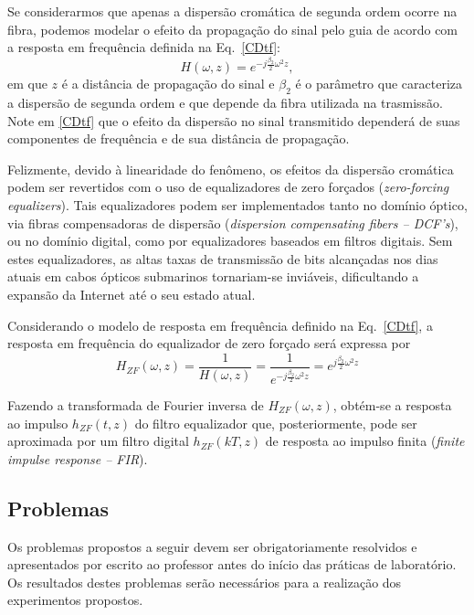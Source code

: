 \documentclass[12pt,addpoints]{exam}
\begin{document}
Se considerarmos que apenas a dispersão cromática de segunda ordem ocorre na fibra, podemos modelar o efeito da propagação do sinal pelo guia de acordo com a resposta em frequência definida na Eq.~\ref{CDtf}:
\begin{equation}\label{CDtf}
    H(\omega, z) = e^{-j\frac{\beta_2}{2}\omega^2z},
\end{equation}
\noindent em que $z$ é a distância de propagação do sinal e $\beta_2$ é o parâmetro que caracteriza a dispersão de segunda ordem e que depende da fibra utilizada na trasmissão. Note em \ref{CDtf} que o efeito da dispersão no sinal transmitido dependerá de suas componentes de frequência e de sua distância de propagação.

Felizmente, devido à linearidade do fenômeno, os efeitos da dispersão cromática podem ser revertidos com o uso de equalizadores de zero forçados (\textit{zero-forcing equalizers}). Tais equalizadores podem ser implementados tanto no domínio óptico, via fibras compensadoras de dispersão (\textit{dispersion compensating fibers -- DCF's}), ou no domínio digital, como por equalizadores baseados em filtros digitais. Sem estes equalizadores, as altas taxas de transmissão de bits alcançadas nos dias atuais em cabos ópticos submarinos tornariam-se inviáveis, dificultando a expansão da Internet até o seu estado atual.

Considerando o modelo de resposta em frequência definido na Eq.~\ref{CDtf}, a resposta em frequência do equalizador de zero forçado será expressa por
\begin{equation}\label{CDzf}
H_{ZF}(\omega, z) = \frac{1}{H(\omega, z)}= \frac{1}{e^{-j\frac{\beta_2}{2}\omega^2z}} = e^{j\frac{\beta_2}{2}\omega^2z}
\end{equation}

Fazendo a transformada de Fourier inversa de $H_{ZF}(\omega, z)$, obtém-se a resposta ao impulso $h_{ZF}(t, z)$ do filtro equalizador que, posteriormente, pode ser aproximada por um filtro digital $h_{ZF}(kT, z)$ de resposta ao impulso finita (\textit{finite impulse response -- FIR}).

\subsection{Problemas}

Os problemas propostos a seguir devem ser obrigatoriamente resolvidos e apresentados por escrito ao professor antes do início das práticas de laboratório. Os resultados destes problemas serão necessários para a realização dos experimentos propostos. 
\end{document}
